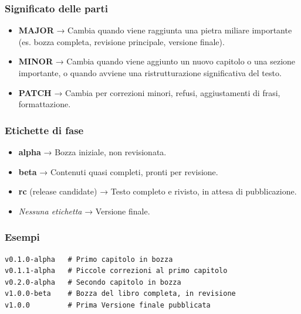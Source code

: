 \documentclass[
  italian,
  letterpaper,
  paper=6in:9in,
  pagesize=pdftex,
  headinclude=on,
  footinclude=on,
  11pt]{scrbook}
\providecommand{\tightlist}{%
  \setlength{\itemsep}{0pt}\setlength{\parskip}{0pt}}
\begin{document}
\subsubsection*{Significato delle parti}\label{significato-delle-parti}

\begin{itemize}
\tightlist
\item
  \textbf{MAJOR} → Cambia quando viene raggiunta una pietra miliare
  importante (es. bozza completa, revisione principale, versione
  finale).
\item
  \textbf{MINOR} → Cambia quando viene aggiunto un nuovo capitolo o una
  sezione importante, o quando avviene una ristrutturazione
  significativa del testo.
\item
  \textbf{PATCH} → Cambia per correzioni minori, refusi, aggiustamenti
  di frasi, formattazione.
\end{itemize}

\subsubsection*{Etichette di fase}\label{etichette-di-fase}

\begin{itemize}
\tightlist
\item
  \textbf{alpha} → Bozza iniziale, non revisionata.
\item
  \textbf{beta} → Contenuti quasi completi, pronti per revisione.
\item
  \textbf{rc} (release candidate) → Testo completo e rivisto, in attesa
  di pubblicazione.
\item
  \emph{Nessuna etichetta} → Versione finale.
\end{itemize}

\subsubsection*{Esempi}\label{esempi}

\begin{verbatim}
v0.1.0-alpha   # Primo capitolo in bozza
v0.1.1-alpha   # Piccole correzioni al primo capitolo
v0.2.0-alpha   # Secondo capitolo in bozza
v1.0.0-beta    # Bozza del libro completa, in revisione
v1.0.0         # Prima Versione finale pubblicata
\end{verbatim}
\end{document}
